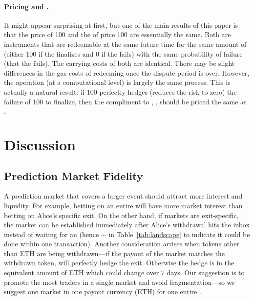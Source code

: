 \paragraph*{Pricing \final and \fail.}

It might appear surprising at first, but one of the main results of this paper is that the price of 100 \ethxx and the of price 100 \final are essentially the same. Both are instruments that are redeemable at the same future time for the same amount of \ethone (either 100 if the \rblock finalizes and 0 if the \rblock fails) with the same probability of failure (that the \rblock fails). The carrying costs of both are identical. There may be slight differences in the gas costs of redeeming \ethone once the dispute period is over. However, the operation (at a computational level) is largely the same process. This is actually a natural result: if 100 \fail perfectly hedges (reduces the risk to zero) the failure of 100 \ethxx to finalize, then the compliment to \fail, \final, should be priced the same as \ethxx. 

\section{Discussion}

\subsection{Prediction Market Fidelity}
\label{sec:fidelity}


A prediction market that covers a larger event should attract more interest and liquidity. For example, betting on an entire \rblock will have more market interest than betting on Alice's specific exit. On the other hand, if markets are exit-specific, the market can be established immediately after Alice's withdrawal hits the inbox instead of waiting for an \rblock (hence $\sim$ in Table~\ref{tab:landscape} to indicate it could be done within one \layerone transaction). Another consideration arrises when tokens other than ETH are being withdrawn---if the payout of the market matches the withdrawn token, \fail will perfectly hedge the exit. Otherwise the hedge is in the equivalent amount of ETH which could change over 7 days. Our suggestion is to promote the most traders in a single market and avoid fragmentation---so we suggest one market in one payout currency (ETH) for one entire \rblock.

